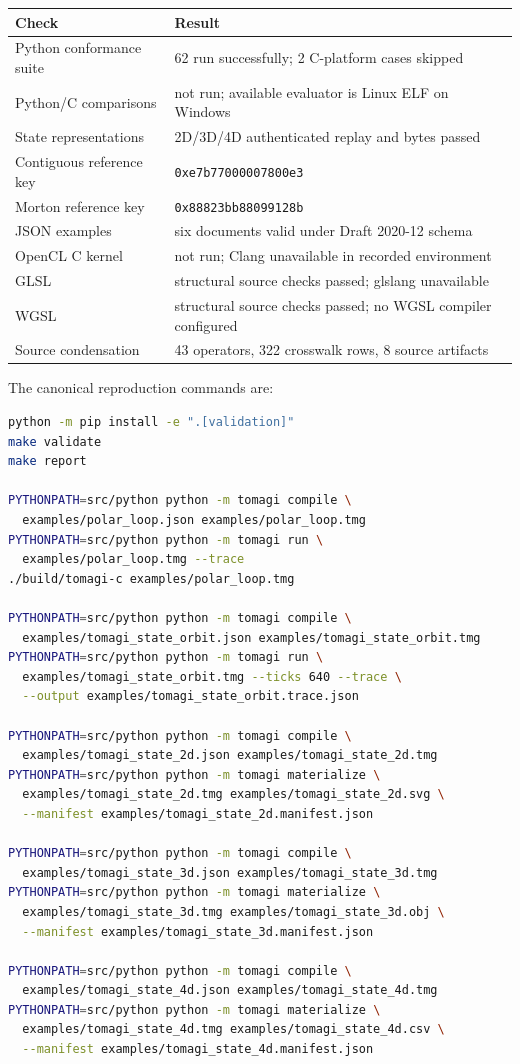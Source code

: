 \documentclass[11pt,a4paper]{article}
\newcommand{\code}[1]{\texttt{#1}}
\begin{document}
\begin{center}
\begin{tabular}{@{}L{0.48\textwidth}L{0.42\textwidth}@{}}
\toprule
Check & Result\\
\midrule
Python conformance suite & 62 run successfully; 2 C-platform cases skipped\\
Python/C comparisons & not run; available evaluator is Linux ELF on Windows\\
State representations & 2D/3D/4D authenticated replay and bytes passed\\
Contiguous reference key & \code{0xe7b77000007800e3}\\
Morton reference key & \code{0x88823bb88099128b}\\
JSON examples & six documents valid under Draft 2020-12 schema\\
OpenCL C kernel & not run; Clang unavailable in recorded environment\\
GLSL & structural source checks passed; glslang unavailable\\
WGSL & structural source checks passed; no WGSL compiler configured\\
Source condensation & 43 operators, 322 crosswalk rows, 8 source artifacts\\
\bottomrule
\end{tabular}
\end{center}

The canonical reproduction commands are:
\begin{lstlisting}[language=bash]
python -m pip install -e ".[validation]"
make validate
make report

PYTHONPATH=src/python python -m tomagi compile \
  examples/polar_loop.json examples/polar_loop.tmg
PYTHONPATH=src/python python -m tomagi run \
  examples/polar_loop.tmg --trace
./build/tomagi-c examples/polar_loop.tmg

PYTHONPATH=src/python python -m tomagi compile \
  examples/tomagi_state_orbit.json examples/tomagi_state_orbit.tmg
PYTHONPATH=src/python python -m tomagi run \
  examples/tomagi_state_orbit.tmg --ticks 640 --trace \
  --output examples/tomagi_state_orbit.trace.json

PYTHONPATH=src/python python -m tomagi compile \
  examples/tomagi_state_2d.json examples/tomagi_state_2d.tmg
PYTHONPATH=src/python python -m tomagi materialize \
  examples/tomagi_state_2d.tmg examples/tomagi_state_2d.svg \
  --manifest examples/tomagi_state_2d.manifest.json

PYTHONPATH=src/python python -m tomagi compile \
  examples/tomagi_state_3d.json examples/tomagi_state_3d.tmg
PYTHONPATH=src/python python -m tomagi materialize \
  examples/tomagi_state_3d.tmg examples/tomagi_state_3d.obj \
  --manifest examples/tomagi_state_3d.manifest.json

PYTHONPATH=src/python python -m tomagi compile \
  examples/tomagi_state_4d.json examples/tomagi_state_4d.tmg
PYTHONPATH=src/python python -m tomagi materialize \
  examples/tomagi_state_4d.tmg examples/tomagi_state_4d.csv \
  --manifest examples/tomagi_state_4d.manifest.json
\end{lstlisting}
\end{document}
